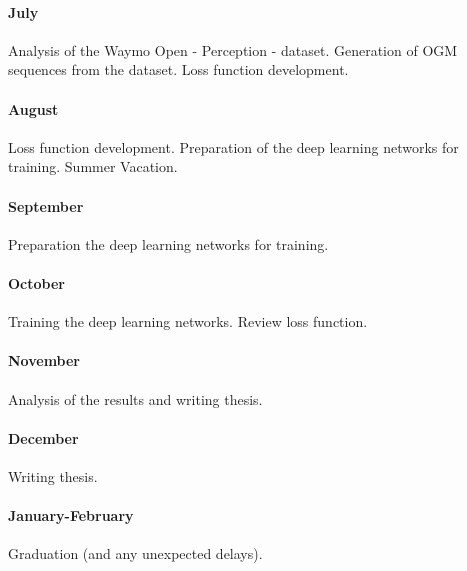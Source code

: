 \paragraph{July} Analysis of the Waymo Open - Perception - \cite{sun2020scalability} dataset. Generation of \gls{OGM} sequences from the dataset. Loss function development.
\paragraph{August} Loss function development. Preparation of the deep learning networks for training. Summer Vacation.
\paragraph{September} Preparation the deep learning networks for training.
\paragraph{October} Training the deep learning networks. Review loss function.
\paragraph{November} Analysis of the results and writing thesis. 
\paragraph{December} Writing thesis.
\paragraph{January-February} Graduation (and any unexpected delays).


